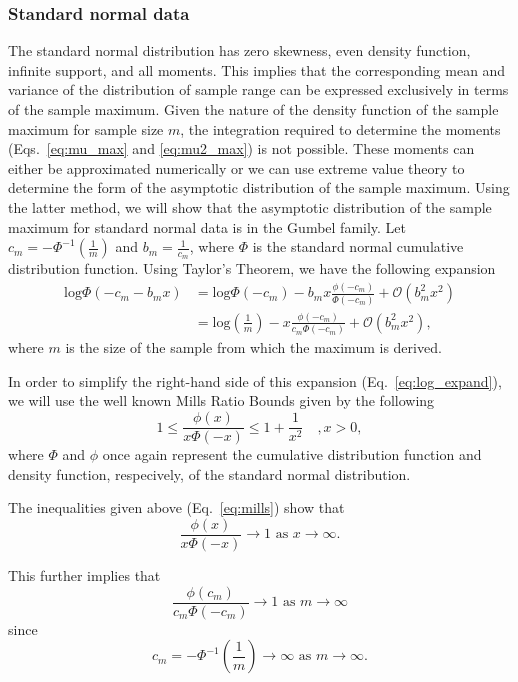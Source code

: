 \documentclass[10pt,letterpaper]{article}
\begin{document}
\subsubsection*{Standard normal data}

The standard normal distribution has zero skewness, even density function, infinite support, and all moments. This implies that the corresponding mean and variance of the distribution of sample range can be expressed exclusively in terms of the sample maximum. Given the nature of the density function of the sample maximum for sample size $m$, the integration required to determine the moments (Eqs.~\ref{eq:mu_max} and \ref{eq:mu2_max}) is not possible. These moments can either be approximated numerically or we can use extreme value theory to determine the form of the asymptotic distribution of the sample maximum. Using the latter method, we will show that the asymptotic distribution of the sample maximum for standard normal data is in the Gumbel family. Let $c_m = -\Phi^{-1}\left(\frac{1}{m}\right)$ and $b_m = \frac{1}{c_m}$, where $\Phi$ is the standard normal cumulative distribution function. Using Taylor's Theorem, we have the following expansion
%
\begin{equation}\label{eq:log_expand}
\begin{aligned}
\text{log}\Phi(-c_m - b_m x) &= \text{log}\Phi(-c_m) - b_m x \frac{\phi(-c_m)}{\Phi(-c_m)} + \mathcal{O}(b^2_m x^2) \\
&= \text{log}\left(\frac{1}{m}\right) - x \frac{\phi(-c_m)}{c_m \Phi(-c_m)} + \mathcal{O}(b^2_m x^2),
\end{aligned}
\end{equation}
%
where $m$ is the size of the sample from which the maximum is derived.

In order to simplify the right-hand side of this expansion (Eq.~\ref{eq:log_expand}), we will use the well known Mills Ratio Bounds \cite{chatterjee2014} given by the following
%
\begin{equation}\label{eq:mills}
1 \leq \frac{\phi(x)}{x \Phi(-x)} \leq 1 + \frac{1}{x^2} \quad , x > 0,
\end{equation}
%
where $\Phi$ and $\phi$ once again represent the cumulative distribution function and density function, respecively, of the standard normal distribution.

The inequalities given above (Eq.~\ref{eq:mills}) show that 
%
\[\frac{\phi(x)}{x \Phi(-x)} \rightarrow 1 \text{ as } x \rightarrow \infty.
\] 

This further implies that 
%
\[
\frac{\phi(c_m)}{c_m \Phi(-c_m)} \rightarrow 1 \text{ as } m \rightarrow \infty
\] 
%
since 
%
\[
c_m = -\Phi^{-1}\left(\frac{1}{m}\right) \rightarrow \infty \text{ as } m \rightarrow \infty.
\] 
\end{document}
